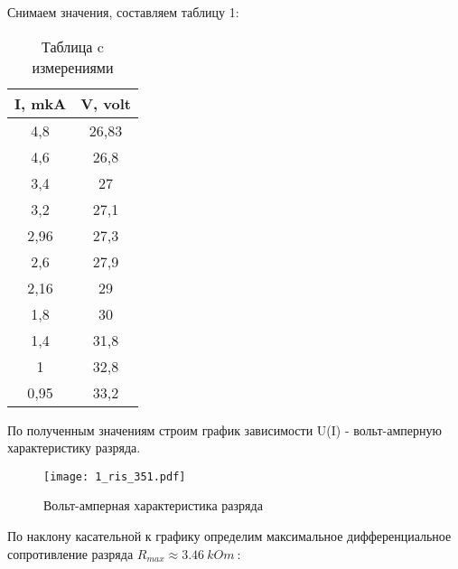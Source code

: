 \documentclass[a4paper,12pt]{article}
\begin{document}
Снимаем значения, составляем таблицу 1:
\begin{table}[!]
    \caption{Таблица c измерениями}
        \begin{center}
            \begin{tabular}{| c | c |}
            \hline
            \textbf{I, mkA} & \textbf{V, volt}\\
            \hline
            4,8	& 26,83\\
            \hline
            4,6 & 26,8\\
            \hline
            3,4	& 27\\
            \hline 
            3,2	& 27,1\\
            \hline
            2,96 &	27,3\\
            \hline
            2,6	& 27,9\\
            \hline
            2,16 &	29\\
            \hline
            1,8	& 30\\
            \hline
            1,4	& 31,8\\
            \hline
            1 & 32,8\\
            \hline
            0,95 &	33,2\\
            \hline
        \end{tabular}
    \end{center}
\label{A_table}
\end{table}


По полученным значениям строим график зависимости U(I) - вольт-амперную характеристику разряда. 

\begin{figure}[h!]
	\centering
	\texttt{[image: 1\_ris\_351.pdf]}
	\caption{Вольт-амперная характеристика разряда}
	\label{C}
\end{figure}

По наклону касательной к графику определим максимальное дифференциальное сопротивление разряда $R_{max} \approx 3.46 \: kOm \:$:
\end{document}
